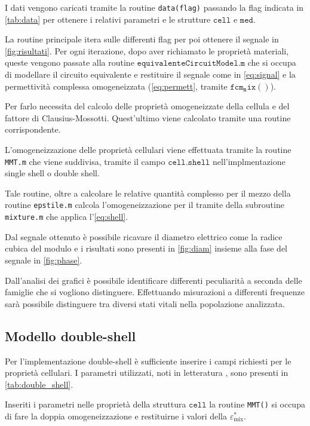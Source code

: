 I dati vengono caricati tramite la routine \texttt{data(flag)} passando la flag indicata in \cref{tab:data} per ottenere i relativi parametri e le strutture $\mathtt{cell}$ e $\mathtt{med}$.

La routine principale itera sulle differenti flag per poi ottenere il segnale in \cref{fig:risultati}. Per ogni iterazione, dopo aver richiamato le proprietà materiali, queste vengono passate alla routine $\mathtt{equivalenteCircuitModel.m}$ che si occupa di modellare il circuito equivalente e restituire il segnale come in \cref{eq:signal} e la permettività complessa omogeneizzata (\cref{eq:permett}, tramite $\mathtt{fcm_mix()}$).

Per farlo necessita del calcolo delle proprietà omogeneizzate della cellula e del fattore di Clausius-Mossotti. Quest'ultimo viene calcolato tramite una routine corrispondente. 

L'omogeneizzazione delle proprietà cellulari viene effettuata tramite la routine \texttt{MMT.m} che viene suddivisa, tramite il campo $\mathtt{cell.shell}$ nell'implmentazione single shell o double shell.  

Tale routine, oltre a calcolare le relative quantità complesso per il mezzo della routine \texttt{epstile.m} calcola l'omogeneizzazione per il tramite della subroutine \texttt{mixture.m} che applica l'\cref{eq:shell}.

Dal segnale ottenuto è possibile ricavare il diametro elettrico come la radice cubica del modulo e i risultati sono presenti in \cref{fig:diam} insieme alla fase del segnale in \cref{fig:phase}.

Dall'analisi dei grafici è possibile identificare differenti peculiarità a seconda delle famiglie che si vogliono distinguere. Effettuando misurazioni a differenti frequenze sarà possibile distinguere tra diversi stati vitali nella popolazione analizzata.




\subsection{Modello double-shell}

Per l'implementazione double-shell è sufficiente inserire i campi richiesti per le proprietà cellulari. I parametri utilizzati, noti in letteratura \cite{irimajiri_dielectric_1979}, sono presenti in \cref{tab:double_shell}.

Inseriti i parametri nelle proprietà della struttura $\mathtt{cell}$ la routine \texttt{MMT()} si occupa di fare la doppia omogeneizzazione e restituirne i valori della $\varepsilon_{\operatorname{mix}}^*$. 

